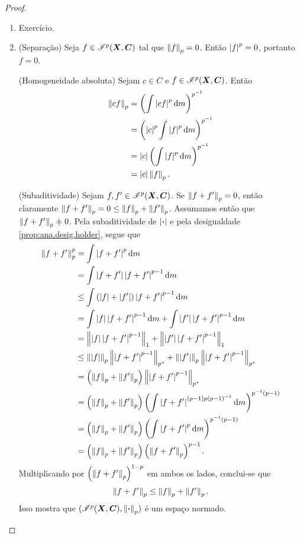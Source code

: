 \begin{proof}
	\begin{enumerate}
	\item Exercício.
	
	\item (Separação) Seja $f \in \Intg^p(\bm X,\bm C)$ tal que $\nor{f}_p = 0$. Então $\abs{f}^p = 0$, portanto $f=0$.
	
(Homogeneidade absoluta) Sejam $c \in C$ e $f \in \Intg^p(\bm X,\bm C)$. Então
		\begin{align*}
		\nor{cf}_p &= \left( \int \abs{cf}^p \dd\med \right)^{p\inv} \\
			&= \left( \abs{c}^p \int \abs{f}^p \dd\med \right)^{p\inv} \\
			&= \abs{c} \left( \int \abs{f}^p \dd\med \right)^{p\inv} \\
			&= \abs{c}\nor{f}_p.
		\end{align*}

(Subaditividade) Sejam $f,f' \in \Intg^p(\bm X,\bm C)$. Se $\nor{f+f'}_p = 0$, então claramente $\nor{f+f'}_p = 0 \leq \nor{f}_p + \nor{f'}_p$. Assumamos então que $\nor{f+f'}_p \neq 0$. Pela subaditividade de $\abs{\var}$ e pela desigualdade \ref{prop:ana.desig.holder}, segue que
		\begin{align*}
		\nor{f+f'}_p^p &= \int \abs{f+f'}^p \dd\med \\
			&= \int \abs{f+f'}\abs{f+f'}^{p-1} \dd\med \\
			&\leq \int \left( \abs{f} + \abs{f'} \right) \abs{f+f'}^{p-1} \dd\med \\
			&= \int \abs{f}\abs{f+f'}^{p-1} \dd\med + \int \abs{f'}\abs{f+f'}^{p-1} \dd\med \\
			&= \nor{\abs{f}\abs{f+f'}^{p-1}}_1 + \nor{\abs{f'}\abs{f+f'}^{p-1}}_1 \\
			&\leq \nor{\abs{f}}_p \nor{\abs{f+f'}^{p-1}}_{p\dual} + \nor{\abs{f'}}_p \nor{\abs{f+f'}^{p-1}}_{p\dual} \\
			&= \left( \nor{f}_p + \nor{f'}_p \right) \nor{\abs{f+f'}^{p-1}}_{p\dual} \\
			&= \left( \nor{f}_p + \nor{f'}_p \right) \left( \int \abs{f+f'}^{(p-1) p (p-1)\inv} \dd\med \right)^{p\inv(p-1)} \\
			&= \left( \nor{f}_p + \nor{f'}_p \right) \left( \int \abs{f+f'}^p \dd\med \right)^{p\inv (p-1)} \\
			&= \left( \nor{f}_p + \nor{f'}_p \right) \left( \nor{f+f'}_p \right)^{p-1}.
		\end{align*}
Multiplicando por $\left( \nor{f+f'}_p \right)^{1-p}$ em ambos os lados, conclui-se que
		\begin{equation*}
		\nor{f+f'}_p \leq \nor{f}_p + \nor{f'}_p.
		\end{equation*}
Isso mostra que $(\Intg^p(\bm X,\bm C),\nor{\var}_p)$ é um espaço normado. 


\end{enumerate}
\end{proof}
